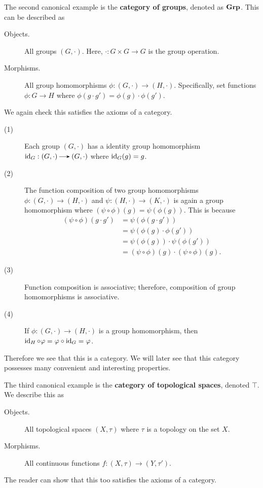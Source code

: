    \begin{example}
        The second canonical example is the \textbf{category of groups}, denoted 
        as $\operatorname{\mathbf{Grp}}$. This can be described as 
        \begin{description}
            \item[Objects.] All groups $(G, \cdot)$. Here, $\cdot: G \times G \to G$ is the group operation. 
            \item[Morphisms.] All group homomorphisms $\phi: (G, \cdot) \to (H, \cdot)$. 
            Specifically, set functions $\phi: G \to H$ where $\phi(g \cdot g') = \phi(g)\cdot \phi(g')$. 
        \end{description}        
        We again check this satisfies the axioms of a category. 
        \begin{description}
            \item[(1)] Each group $(G, \cdot)$ has a identity group homomorphism $\id_G: (G, \cdot) \to (G, \cdot)$ where 
            $\operatorname{\mathrm{id}}_G(g) = g$. 
            \item[(2)] The function composition of two group homomorphisms $\phi: (G, \cdot) \to (H, \cdot)$ and $\psi: (H, \cdot) \to (K, \cdot)$ 
            is again a group homomorphism where $(\psi \circ \phi)(g) = \psi(\phi(g))$. This is because 
            \begin{align*}
                (\psi \circ \phi)(g \cdot g')&=
                \psi(\phi(g \cdot g'))\\ 
                &= \psi(\phi(g)\cdot \phi(g')) \\
                &= \psi(\phi(g)) \cdot \psi(\phi(g'))\\
                &= (\psi \circ \phi)(g) \cdot (\psi \circ \phi)(g).
            \end{align*}
            \item[(3)] Function composition is associative; therefore, composition of group homomorphisms is associative.
            \item[(4)] If $\phi: (G, \cdot) \to (H, \cdot)$ is a group homomorphism, then 
            $\operatorname{\mathrm{id}}_H \circ \varphi = \varphi \circ \operatorname{\mathrm{id}}_G = \varphi$.
        \end{description}
        Therefore we see that this is a category. We will later see that this category possesses 
        many convenient and interesting properties. 
    \end{example}

    \begin{example}
        The third canonical example is the \textbf{category of topological spaces}, 
        denoted $\top$. We describe this as 
        \begin{description}
            \item[Objects.] All topological spaces $(X, \tau)$ where $\tau$ is a topology on the set $X$. 
            \item[Morphisms.] All continuous functions $f: (X, \tau) \to (Y, \tau')$.   
        \end{description}
        The reader can show that this too satisfies the axioms of a category.
    \end{example}

